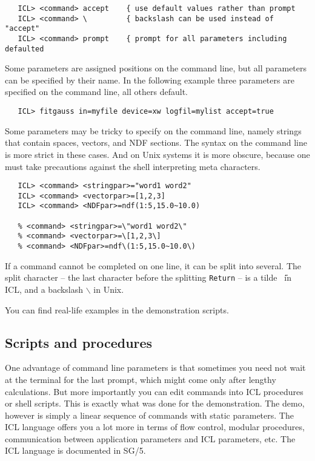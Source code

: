 \begin{verbatim}
   ICL> <command> accept    { use default values rather than prompt
   ICL> <command> \         { backslash can be used instead of "accept"
   ICL> <command> prompt    { prompt for all parameters including defaulted
\end{verbatim}

Some parameters are assigned positions on the command line, but all parameters
can be specified by their name. In the following example three
parameters are specified on the command line, all others default.

\begin{verbatim}
   ICL> fitgauss in=myfile device=xw logfil=mylist accept=true
\end{verbatim}

Some parameters may be tricky to specify on the command line, namely strings
that contain spaces, vectors, and NDF sections. The syntax on the command line
is more strict in these cases. And on Unix systems it is more obscure, because
one must take precautions against the shell interpreting meta characters.

\begin{verbatim}
   ICL> <command> <stringpar>="word1 word2"
   ICL> <command> <vectorpar>=[1,2,3]
   ICL> <command> <NDFpar>=ndf(1:5,15.0~10.0)

   % <command> <stringpar>=\"word1 word2\"
   % <command> <vectorpar>=\[1,2,3\]
   % <command> <NDFpar>=ndf\(1:5,15.0~10.0\)
\end{verbatim}

If a command cannot be completed on one line, it can be split into several. The
split character -- the last character before the splitting {\tt Return} -- is a
tilde {\tt \~\ }in ICL, and a backslash $\backslash$ in Unix.

You can find real-life examples in the demonstration scripts.

\goodbreak
\subsection{Scripts and procedures}

One advantage of command line parameters is that sometimes you need not wait at
the terminal for the last prompt, which might come only after lengthy
calculations. But more importantly you can edit commands into ICL procedures or
shell scripts. This is exactly what was done for the demonstration. The demo,
however is simply a linear sequence of commands with static parameters. The ICL
language offers you a lot more in terms of flow control, modular procedures,
communication between application parameters and ICL parameters, etc. The ICL
language is documented in SG/5.


